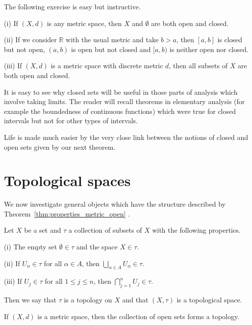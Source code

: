 The following exercise is easy but instructive.
\begin{problem} (i) If $(X,d)$ is any metric space,
then $X$ and $\emptyset$ are both open and closed.

(ii) If we consider ${\mathbb R}$ with the usual metric
and take $b>a$, then $[a,b]$ is closed but not open,
$(a,b)$ is open but not closed and $[a,b)$ is neither
open nor closed.

(iii) If $(X,d)$ is
a metric space with discrete metric $d$, then
all subsets of $X$ are both open and closed.
\end{problem}
It is easy to see why closed sets will be useful in
those parts of analysis which involve taking limits.
The reader will recall theorems in elementary analysis
(for example the boundedness of continuous functions)
which were true for closed intervals but not for
other types of intervals.

Life is made much easier by the very close link between
the notions of closed and open sets given by our next theorem.









\section{Topological spaces}

We now investigate general objects which have the structure described by Theorem~\ref{thm:properties_metric_open} .
\begin{definition}\label{D;topology}
Let $X$ be a set and $\tau$ a collection of subsets of $X$
with the following properties.

(i) The empty set $\emptyset\in \tau$ and the space $X\in\tau$.

(ii) If $U_{\alpha}\in\tau$ for all $\alpha\in A$, then
$\bigcup_{\alpha\in A} U_{\alpha}\in\tau$.

(iii) If $U_{j}\in\tau$ for all $1\leq j\leq n$, then
$\bigcap_{j=1}^{n} U_{j}\in\tau$.

Then we say that $\tau$ is a topology on $X$ and
that $(X,\tau)$ is a topological space.
\end{definition}

\begin{theorem}\label{T;metric topology}
If $(X,d)$ is a metric space, then the collection of open sets forms a topology.
\end{theorem}

